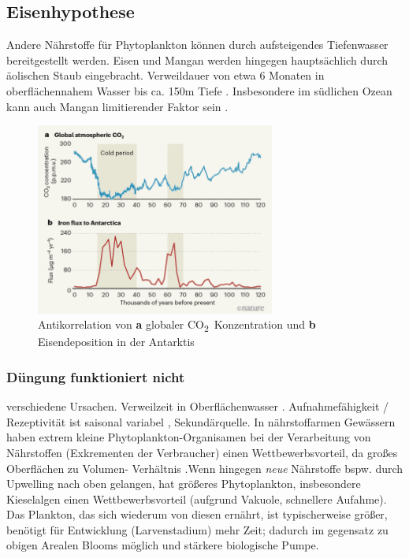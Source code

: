 \documentclass[12pt,a4paper,onecolumn]{scrartcl}
\newcommand{\cotwo}{CO\textsubscript{2}}
\begin{document}
\subsection{Eisenhypothese}
Andere Nährstoffe für Phytoplankton können durch aufsteigendes Tiefenwasser bereitgestellt werden. Eisen und Mangan werden hingegen hauptsächlich durch äolischen Staub eingebracht. Verweildauer von etwa 6 Monaten in oberflächennahem Wasser bis ca. 150m Tiefe
\citep{Hayes.2015}. Insbesondere im südlichen Ozean kann auch Mangan limitierender Faktor sein \citep{Browning.2021}.
\begin{figure}[ht]
\centering
\includegraphics[width=0.7\textwidth]{bilder/Stoll2020/antarctic-iron-global-co2.png}
\caption{Antikorrelation von \textbf{a} globaler \cotwo \ Konzentration und \textbf{b} Eisendeposition in der Antarktis \citep{Stoll.2020}}
\end{figure}
\subsubsection{Düngung funktioniert nicht}
verschiedene Ursachen. Verweilzeit in Oberflächenwasser \citep{Hayes.2015}. Aufnahmefähigkeit / Rezeptivität ist saisonal variabel \citep{Gabric.2016}, Sekundärquelle. In nährstoffarmen Gewässern haben extrem kleine Phytoplankton-Organisamen bei der Verarbeitung von Nährstoffen (Exkrementen der Verbraucher) einen Wettbewerbsvorteil, da großes Oberflächen zu Volumen- Verhältnis \citep{Falkowski.1998}.Wenn hingegen \textit{neue} Nährstoffe bspw. durch Upwelling nach oben gelangen, hat größeres Phytoplankton, insbesondere Kieselalgen einen Wettbewerbsvorteil (aufgrund Vakuole, schnellere Aufahme). Das Plankton, das sich wiederum von diesen ernährt, ist typischerweise größer, benötigt für Entwicklung (Larvenstadium) mehr Zeit; dadurch im gegensatz zu obigen Arealen Blooms möglich und stärkere biologische Pumpe. \citep{Falkowski.1998}
\end{document}

